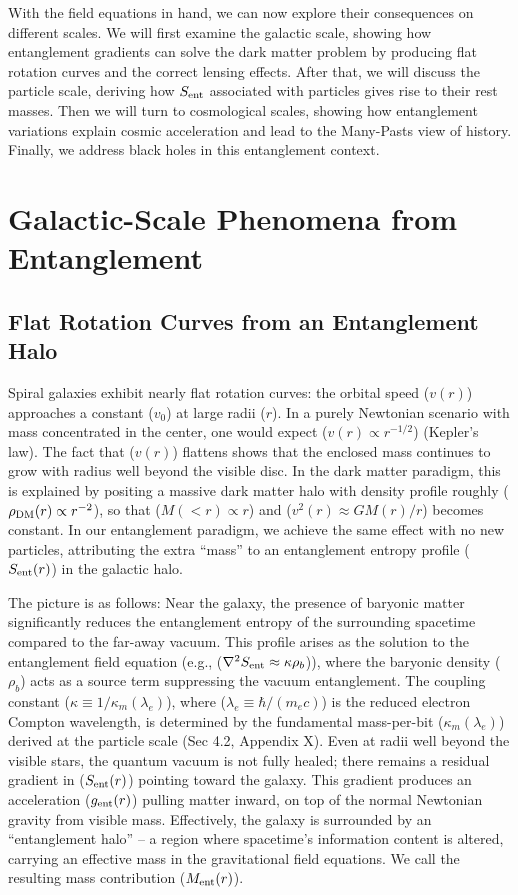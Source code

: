 \documentclass[11pt]{article}
\begin{document}
With the field equations in hand, we can now explore their consequences on different scales. We will first examine the galactic scale, showing how entanglement gradients can solve the dark matter problem by producing flat rotation curves and the correct lensing effects. After that, we will discuss the particle scale, deriving how $S_{\rm ent}$ associated with particles gives rise to their rest masses. Then we will turn to cosmological scales, showing how entanglement variations explain cosmic acceleration and lead to the Many-Pasts view of history. Finally, we address black holes in this entanglement context.

\section{Galactic-Scale Phenomena from Entanglement}

\subsection{Flat Rotation Curves from an Entanglement Halo}

Spiral galaxies exhibit nearly flat rotation curves: the orbital speed ($v(r)$) approaches a constant ($v_0$) at large radii ($r$). In a purely Newtonian scenario with mass concentrated in the center, one would expect ($v(r) \propto r^{-1/2}$) (Kepler’s law). The fact that ($v(r)$) flattens shows that the enclosed mass continues to grow with radius well beyond the visible disc. In the dark matter paradigm, this is explained by positing a massive dark matter halo with density profile roughly ($\rho_{\rm DM}(r) \propto r^{-2}$), so that ($M(<r) \propto r$) and ($v^2(r) \approx GM(r)/r$) becomes constant. In our entanglement paradigm, we achieve the same effect with no new particles, attributing the extra “mass” to an entanglement entropy profile ($S_{\rm ent}(r)$) in the galactic halo.

The picture is as follows: Near the galaxy, the presence of baryonic matter significantly reduces the entanglement entropy of the surrounding spacetime compared to the far-away vacuum. This profile arises as the solution to the entanglement field equation (e.g., ($\nabla^2 S_{\rm ent} \approx \kappa \rho_b$)), where the baryonic density ($\rho_b$) acts as a source term suppressing the vacuum entanglement. The coupling constant ($\kappa \equiv 1/\kappa_m(\lambda_e)$), where ($\lambda_e \equiv \hbar/(m_e c)$) is the reduced electron Compton wavelength, is determined by the fundamental mass-per-bit ($\kappa_m(\lambda_e)$) derived at the particle scale (Sec 4.2, Appendix X). Even at radii well beyond the visible stars, the quantum vacuum is not fully healed; there remains a residual gradient in ($S_{\rm ent}(r)$) pointing toward the galaxy. This gradient produces an acceleration ($g_{\rm ent}(r)$) pulling matter inward, on top of the normal Newtonian gravity from visible mass. Effectively, the galaxy is surrounded by an “entanglement halo” – a region where spacetime’s information content is altered, carrying an effective mass in the gravitational field equations. We call the resulting mass contribution ($M_{\rm ent}(r)$).  
\end{document}

